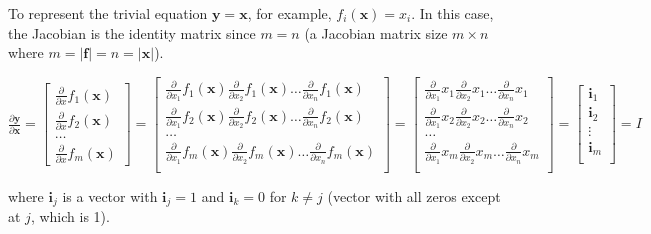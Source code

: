 \documentclass[11pt]{article}
\begin{document}
To represent the trivial equation $\mathbf{y} = \mathbf{x}$, for example, $f_i(\mathbf{x}) = x_i$. In this case, the Jacobian is the identity matrix since $m=n$ (a Jacobian matrix size $m \times n$ where $m = |\mathbf{f}| = n = |\mathbf{x}|$).

$
\frac{\partial \mathbf{y}}{\partial \mathbf{x}} = \begin{bmatrix}
\frac{\partial}{\partial {x}} f_1(\mathbf{x}) \\
\frac{\partial}{\partial {x}} f_2(\mathbf{x})\\
\ldots\\
\frac{\partial}{\partial {x}} f_m(\mathbf{x})
\end{bmatrix} = \begin{bmatrix}
\frac{\partial}{\partial {x_1}} f_1(\mathbf{x}) \frac{\partial}{\partial {x_2}} f_1(\mathbf{x}) \ldots \frac{\partial}{\partial {x_n}} f_1(\mathbf{x}) \\
\frac{\partial}{\partial {x_1}} f_2(\mathbf{x}) \frac{\partial}{\partial {x_2}} f_2(\mathbf{x}) \ldots \frac{\partial}{\partial {x_n}} f_2(\mathbf{x}) \\
\ldots\\
\frac{\partial}{\partial {x_1}} f_m(\mathbf{x}) \frac{\partial}{\partial {x_2}} f_m(\mathbf{x}) \ldots \frac{\partial}{\partial {x_n}} f_m(\mathbf{x}) \\
\end{bmatrix} = \begin{bmatrix}
\frac{\partial}{\partial {x_1}} x_1 \frac{\partial}{\partial {x_2}} x_1 \ldots \frac{\partial}{\partial {x_n}} x_1 \\
\frac{\partial}{\partial {x_1}} x_2 \frac{\partial}{\partial {x_2}} x_2 \ldots \frac{\partial}{\partial {x_n}} x_2 \\
\ldots\\
\frac{\partial}{\partial {x_1}} x_m \frac{\partial}{\partial {x_2}} x_m \ldots \frac{\partial}{\partial {x_n}} x_m \\
\end{bmatrix} = \begin{bmatrix}
           \mathbf{i}_1\\
           \mathbf{i}_2\\
           \vdots \\
           \mathbf{i}_m\\
           \end{bmatrix} = I
$

where $\mathbf{i}_j$ is a vector with $\mathbf{i}_j=1$ and $\mathbf{i}_k=0$ for $k \neq j$ (vector with all zeros except at $j$, which is 1).
\end{document}
